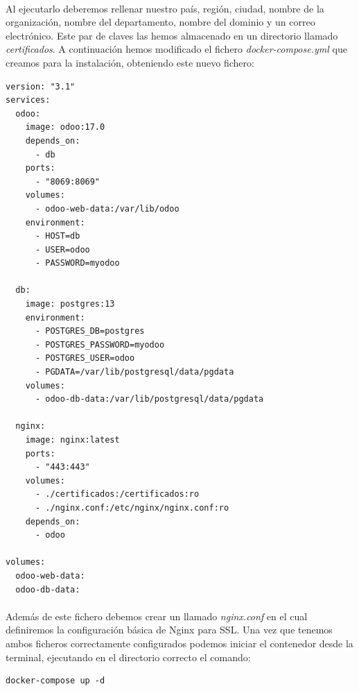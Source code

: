 \paragraph{}
Al ejecutarlo deberemos rellenar nuestro país, región, ciudad, nombre de la organización, nombre del departamento, nombre del dominio y un correo electrónico. Este par de claves las hemos almacenado en un directorio llamado \textit{certificados}. A continuación hemos modificado el fichero \textit{docker-compose.yml} que creamos para la instalación, obteniendo este nuevo fichero: 
\begin{lstlisting}[frame=single, basicstyle=\small]
version: "3.1"
services:
  odoo:
    image: odoo:17.0
    depends_on:
      - db
    ports:
      - "8069:8069"
    volumes:
      - odoo-web-data:/var/lib/odoo
    environment:
      - HOST=db
      - USER=odoo
      - PASSWORD=myodoo

  db:
    image: postgres:13
    environment:
      - POSTGRES_DB=postgres
      - POSTGRES_PASSWORD=myodoo
      - POSTGRES_USER=odoo
      - PGDATA=/var/lib/postgresql/data/pgdata
    volumes:
      - odoo-db-data:/var/lib/postgresql/data/pgdata

  nginx:
    image: nginx:latest
    ports:
      - "443:443"
    volumes:
      - ./certificados:/certificados:ro
      - ./nginx.conf:/etc/nginx/nginx.conf:ro
    depends_on:
      - odoo

volumes:
  odoo-web-data:
  odoo-db-data:
\end{lstlisting}

\paragraph{}
Además de este fichero debemos crear un llamado \textit{nginx.conf} en el cual definiremos la configuración básica de Nginx para SSL. Una vez que tenemos ambos ficheros correctamente configurados podemos iniciar el contenedor desde la terminal, ejecutando en el directorio correcto el comando:
 \begin{lstlisting}[frame=single, basicstyle=\small]
docker-compose up -d
\end{lstlisting}
